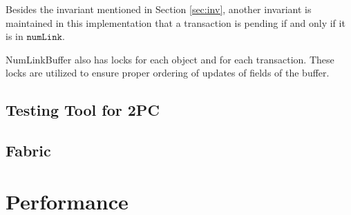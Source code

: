 \documentclass{article}
\begin{document}
Besides the invariant mentioned in Section \ref{sec:inv}, another invariant is 
maintained in this implementation that a transaction is pending if and only if 
it is in $\mathtt{numLink}$.

NumLinkBuffer also has locks for each object and for each transaction. These locks are
utilized to ensure proper ordering of updates of fields of the buffer.



\subsection{Testing Tool for 2PC}

\subsection{Fabric}

\section{Performance}
\label{sec:performance}
\end{document}
